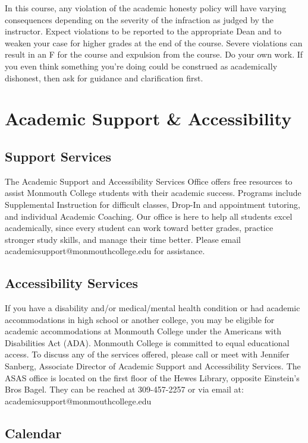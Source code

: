\documentclass[10pt]{article}
\begin{document}
In this course, any violation of the academic honesty policy will have varying consequences depending on the severity of the infraction as judged by the instructor.  Expect violations to be reported to the appropriate Dean and to weaken your case for higher grades at the end of the course. Severe violations can result in an F for the course and expulsion from the course. Do your own work. If you even think something you're doing could be construed as academically dishonest, then ask for guidance and clarification first.


\section{Academic Support \& Accessibility}

\subsection*{Support Services}
The Academic Support and Accessibility Services Office offers free resources to assist Monmouth College students with their academic success. Programs include Supplemental Instruction for difficult classes, Drop-In and appointment tutoring, and individual Academic Coaching. Our office is here to help all students excel academically, since every student can work toward better grades, practice stronger study skills, and manage their time better. Please email academicsupport@monmouthcollege.edu for assistance.

\subsection*{Accessibility Services}
If you have a disability and/or medical/mental health condition or had academic accommodations in high school or another college, you may be eligible for academic accommodations at Monmouth College under the Americans with Disabilities Act (ADA). Monmouth College is committed to equal educational access. To discuss any of the services offered, please call or meet with Jennifer Sanberg, Associate Director of Academic Support and Accessibility Services. The ASAS office is located on the first floor of the Hewes Library, opposite Einstein’s Bros Bagel. They can be reached at 309-457-2257 or via email at: academicsupport@monmouthcollege.edu


\subsection{Calendar}
\end{document}
